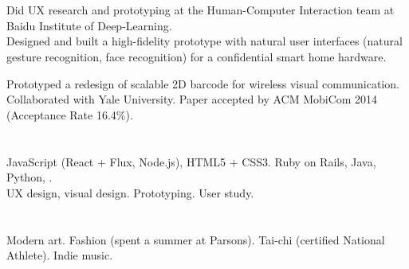 \begin{resume}
\section{}

\begin{position}
Did UX research and prototyping at the Human-Computer Interaction team at Baidu Institute of Deep-Learning. \\
Designed and built a high-fidelity prototype with natural user interfaces (natural gesture recognition, face recognition) for a confidential smart home hardware.
\end{position}

\begin{position}
Prototyped a redesign of scalable 2D barcode for wireless visual communication. \\
Collaborated with Yale University. Paper accepted by ACM MobiCom 2014 (Acceptance Rate 16.4\%).
\end{position}

\section{}
JavaScript (React + Flux, Node.js), HTML5 + CSS3. Ruby on Rails, Java, Python, \Cplusplus. \\
UX design, visual design. Prototyping. User study.

\section{}
Modern art. Fashion (spent a summer at Parsons). Tai-chi (certified National Athlete). Indie music.

\end{resume}

